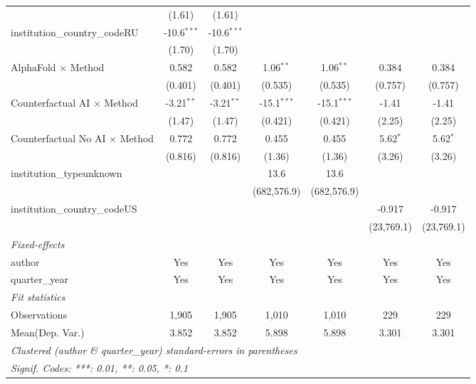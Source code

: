 \begin{tabular}{lcccccc}
                                         & (1.61)        & (1.61)        &               &               &              &   \\   
   institution\_country\_codeRU          & -10.6$^{***}$ & -10.6$^{***}$ &               &               &              &   \\   
                                         & (1.70)        & (1.70)        &               &               &              &   \\   
   AlphaFold $\times$ Method             & 0.582         & 0.582         & 1.06$^{**}$   & 1.06$^{**}$   & 0.384        & 0.384\\   
                                         & (0.401)       & (0.401)       & (0.535)       & (0.535)       & (0.757)      & (0.757)\\   
   Counterfactual AI $\times$ Method     & -3.21$^{**}$  & -3.21$^{**}$  & -15.1$^{***}$ & -15.1$^{***}$ & -1.41        & -1.41\\   
                                         & (1.47)        & (1.47)        & (0.421)       & (0.421)       & (2.25)       & (2.25)\\   
   Counterfactual No AI $\times$ Method  & 0.772         & 0.772         & 0.455         & 0.455         & 5.62$^{*}$   & 5.62$^{*}$\\   
                                         & (0.816)       & (0.816)       & (1.36)        & (1.36)        & (3.26)       & (3.26)\\   
   institution\_typeunknown              &               &               & 13.6          & 13.6          &              &   \\   
                                         &               &               & (682,576.9)   & (682,576.9)   &              &   \\   
   institution\_country\_codeUS          &               &               &               &               & -0.917       & -0.917\\   
                                         &               &               &               &               & (23,769.1)   & (23,769.1)\\   
   \midrule
   \emph{Fixed-effects}\\
   author                                & Yes           & Yes           & Yes           & Yes           & Yes          & Yes\\  
   quarter\_year                         & Yes           & Yes           & Yes           & Yes           & Yes          & Yes\\  
   \midrule
   \emph{Fit statistics}\\
   Observations                          & 1,905         & 1,905         & 1,010         & 1,010         & 229          & 229\\  
Mean(Dep. Var.) & 3.852 & 3.852 & 5.898 & 5.898 & 3.301 & 3.301 \\
   \midrule \midrule
   \multicolumn{7}{l}{\emph{Clustered (author \& quarter\_year) standard-errors in parentheses}}\\
   \multicolumn{7}{l}{\emph{Signif. Codes: ***: 0.01, **: 0.05, *: 0.1}}\\
\end{tabular}
\par\endgroup
